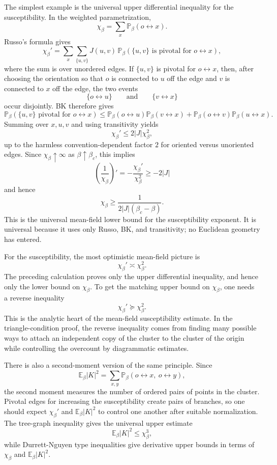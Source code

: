 \documentclass[11pt,reqno]{book}
\numberwithin{equation}{chapter}
\theoremstyle{plain}
\theoremstyle{definition}
\theoremstyle{remark}
\renewcommand{\P}{\mathbb P}
\newcommand{\E}{\mathbb E}
\newcommand{\1}{\mathbf 1}
\newcommand{\suc}{\succeq}
\begin{document}
The simplest example is the universal upper differential inequality for the susceptibility. In the weighted parametrization,
\[
  \chi_\beta=\sum_x\P_\beta(o\leftrightarrow x).
\]
Russo's formula gives
\[
  \chi_\beta'
  =
  \sum_x\sum_{\{u,v\}}
  J(u,v)\,
  \P_\beta(\{u,v\}\text{ is pivotal for }o\leftrightarrow x),
\]
where the sum is over unordered edges. If \(\{u,v\}\) is pivotal for \(o\leftrightarrow x\), then, after choosing the orientation so that \(o\) is connected to \(u\) off the edge and \(v\) is connected to \(x\) off the edge, the two events
\[
  \{o\leftrightarrow u\}
  \qquad\text{and}\qquad
  \{v\leftrightarrow x\}
\]
occur disjointly. BK therefore gives
\[
  \P_\beta(\{u,v\}\text{ pivotal for }o\leftrightarrow x)
  \leq
  \P_\beta(o\leftrightarrow u)\P_\beta(v\leftrightarrow x)
  +
  \P_\beta(o\leftrightarrow v)\P_\beta(u\leftrightarrow x).
\]
Summing over \(x,u,v\) and using transitivity yields
\[
  \chi_\beta'\leq 2|J|\chi_\beta^2,
\]
up to the harmless convention-dependent factor \(2\) for oriented versus unoriented edges. Since \(\chi_\beta\uparrow\infty\) as \(\beta\uparrow\beta_c\), this implies
\[
  \left(\frac1{\chi_\beta}\right)'
  =
  -\frac{\chi_\beta'}{\chi_\beta^2}
  \geq
  -2|J|
\]
and hence
\[
  \chi_\beta\geq \frac{1}{2|J|(\beta_c-\beta)}.
\]
This is the universal mean-field lower bound for the susceptibility exponent. It is universal because it uses only Russo, BK, and transitivity; no Euclidean geometry has entered.

For the susceptibility, the most optimistic mean-field picture is
\[
  \chi_\beta'\asymp \chi_\beta^2.
\]
The preceding calculation proves only the upper differential inequality, and hence only the lower bound on \(\chi_\beta\). To get the matching upper bound on \(\chi_\beta\), one needs a reverse inequality
\[
  \chi_\beta'\suc \chi_\beta^2.
\]
This is the analytic heart of the mean-field susceptibility estimate. In the triangle-condition proof, the reverse inequality comes from finding many possible ways to attach an independent copy of the cluster to the cluster of the origin while controlling the overcount by diagrammatic estimates.

There is also a second-moment version of the same principle. Since
\[
  \E_\beta |K|^2
  =
  \sum_{x,y}\P_\beta(o\leftrightarrow x,\ o\leftrightarrow y),
\]
the second moment measures the number of ordered pairs of points in the cluster. Pivotal edges for increasing the susceptibility create pairs of branches, so one should expect \(\chi_\beta'\) and \(\E_\beta |K|^2\) to control one another after suitable normalization. The tree-graph inequality gives the universal upper estimate
\[
  \E_\beta |K|^2\leq \chi_\beta^3,
\]
while Durrett-Nguyen type inequalities give derivative upper bounds in terms of \(\chi_\beta\) and \(\E_\beta|K|^2\).
\end{document}
